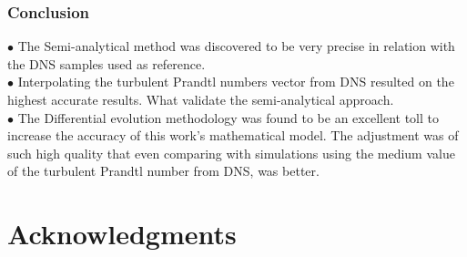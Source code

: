\documentclass[xcolor=dvipsnames,8pt,aspectratio=34]{beamer}
\begin{document}
	\begin{frame}
	\frametitle{Conclusion}
	$\bullet$ The Semi-analytical method was discovered to be very precise in relation with the DNS samples used as reference.\\
	$\bullet$ Interpolating the turbulent Prandtl numbers vector from DNS resulted on the highest accurate results. What validate the semi-analytical approach. \\
	$\bullet$ The Differential evolution methodology was found to be an excellent toll to increase the accuracy of this work's mathematical model. The adjustment was of such high quality that even comparing with simulations using the medium value of the turbulent Prandtl number from DNS, was better.\\
	\end{frame}
	
	
	
	
	
			
		
		
		

	
	\section{Acknowledgments}
		
		
		
		
		
\end{document}
